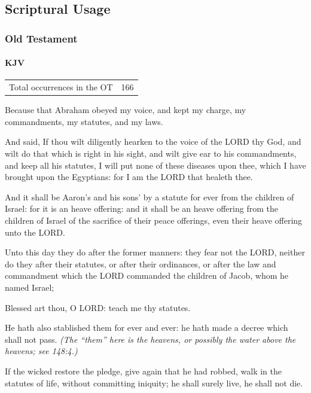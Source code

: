 \subsection{Scriptural Usage} %
	\label{STATUTE-SCRIPTURES}

	\subsubsection{Old Testament} %
		\label{STATUTE-OT}
	
		\paragraph{KJV}
			\label{STATUTE-OT-KJV}
	
			\begin{tabular}{ll}
				Total occurrences in the OT & 166
			\end{tabular}
			
			\begin{compactdesc}
				\item[Genesis 26:5] Because that Abraham obeyed my voice, and kept my charge, my commandments, my statutes, and my laws.
				\item[Exodus 15:26] And said, If thou wilt diligently hearken to the voice of the LORD thy God, and wilt do that which is right in his sight, and wilt give ear to his commandments, and keep all his statutes, I will put none of these diseases upon thee, which I have brought upon the Egyptians: for I am the LORD that healeth thee.
				\item[Exodus 29:28] And it shall be Aaron's and his sons' by a statute for ever from the children of Israel: for it is an heave offering: and it shall be an heave offering from the children of Israel of the sacrifice of their peace offerings, even their heave offering unto the LORD.
				\item[2 Kings 17:34] Unto this day they do after the former manners: they fear not the LORD, neither do they after their statutes, or after their ordinances, or after the law and commandment which the LORD commanded the children of Jacob, whom he named Israel;
				\item[Psalms 119:12] Blessed art thou, O LORD: teach me thy statutes.
				\item[Psalms 148:6] He hath also stablished them for ever and ever: he hath made a decree which shall not pass. \textit{(The ``them'' here is the heavens, or possibly the water above the heavens; see 148:4.)}
				\item[Ezekiel 33:15]  If the wicked restore the pledge, give again that he had robbed, walk in the statutes of life, without committing iniquity; he shall surely live, he shall not die.
			\end{compactdesc}
			
